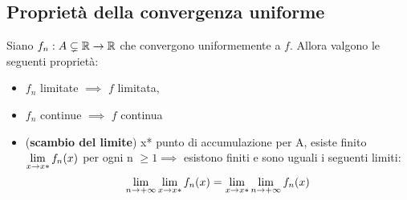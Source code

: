 \documentclass[Completo.tex]{subfiles}
\begin{document}
\subsection{Proprietà della convergenza uniforme}
\begin{eTh}
	Siano $f_n: A \sneq \bb[R] \ra \bb[R]$ che convergono uniformemente a $f$. Allora valgono le seguenti proprietà:
	\begin{itemize}
		\item $f_n$ limitate $\implies$ $f$ limitata,
		\item $f_n$ continue $\implies$ $f$ continua
		\item (\textbf{scambio del limite}) x* punto di accumulazione per A, esiste finito $\lim\limits_{x \rightarrow x*} f_n(x)$ per ogni n $\geq 1 \implies$ esistono finiti e sono uguali i seguenti limiti:
		\begin{equation*}
		\lim\limits_{n \rightarrow +\infty} \lim\limits_{x \rightarrow x*} f_n(x) = \lim\limits_{x \rightarrow x*} \lim\limits_{n \rightarrow +\infty} f_n(x)
		\end{equation*}
	\end{itemize}
\end{eTh}
\end{document}
